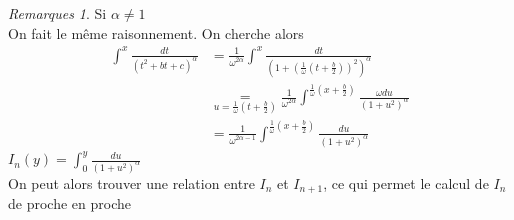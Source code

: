 \documentclass[fleqn]{article}
\theoremstyle{definition} \newtheorem*{defi}{D\'efinition}
\theoremstyle{definition} \newtheorem*{theo}{Th\'eor\`eme}
\theoremstyle{remark} \newtheorem*{rqs}{Remarques}
\theoremstyle{definition} \newtheorem*{prop}{Propri\'et\'e}
\begin{document}
\begin{rqs} Si $\alpha \neq 1$ \\
	On fait le m\^eme raisonnement. On cherche alors
	\begin{align*}
		\int^{x} \frac{dt}{(t^2 + bt + c)^{\alpha}} &= \frac{1}{\omega^{2\alpha}}\int^{x} 
			\frac{dt}{(1 + (\frac{1}{\omega}(t + \frac{b}{2}))^2)^\alpha}\\
		&\underset{u = \frac{1}{\omega}(t + \frac{b}{2})}{=} \frac{1}{\omega^{2\alpha}}\int^{\frac{1}{\omega}(x + \frac{b}{2})} \frac{\omega du}
			{(1 + u^2)^\alpha} \\
		&= \frac{1}{\omega^{2\alpha -1}}\int^{\frac{1}{\omega}(x + \frac{b}{2})} \frac{du}
			{(1 + u^2)^\alpha}
	\end{align*}
$I_n(y) = \int_{0}^{y} \frac{du}{(1+u^2)^\alpha}$ \\
On peut alors trouver une relation entre $I_n$ et $I_{n+1}$, ce qui permet le calcul de $I_n$ de proche en proche
\end{rqs}
\end{document}
